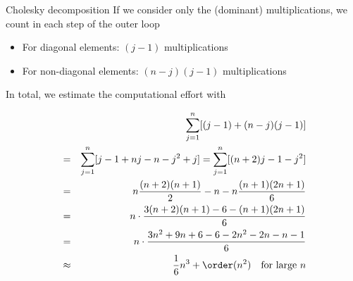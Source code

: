 \documentclass[11pt,compress,t,notes=noshow, xcolor=table]{beamer}
\begin{document}
\begin{vbframe}{Cholesky decomposition}
If we consider only the (dominant) multiplications, we count in each step of the outer loop

\begin{itemize}
\item For diagonal elements: $(j-1)$ multiplications
\item For non-diagonal elements: $(n-j)(j-1)$ multiplications
\end{itemize}

In total, we estimate the computational effort with

\vspace*{-0.4cm}
\begin{eqnarray*}
 & &\sum_{j=1}^n [(j - 1) + (n - j)(j - 1)] \\
&=& \sum_{j=1}^n [j - 1 + nj - n - j^2 + j] = \sum_{j=1}^n[(n + 2) j - 1 - j^2] \\
&=&
n \frac{(n + 2) (n + 1)}{2} - n - n\frac{(n+1)(2n+ 1)}{6} \\
&=& n \cdot \frac{3(n + 2)(n + 1) - 6 - (n + 1)(2n + 1)}{6} \\
&=& n \cdot \frac{3n^2 + 9n + 6 - 6 - 2n^2 - 2n - n - 1} {6}\\
&\approx& \frac{1}{6}n^3 + \order(n^2) \quad \text{for large }n
\end{eqnarray*}

\framebreak
\end{vbframe}
\end{document}
